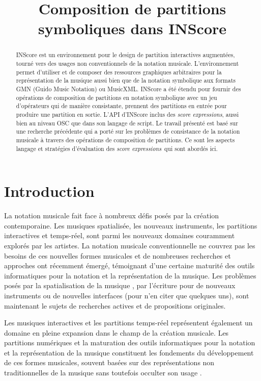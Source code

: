 \documentclass{article}
\title{Composition de partitions symboliques dans INScore}
\newcommand{\sExprs}{\emph{score expressions}}
\begin{document}
%
\maketitle
%
\begin{abstract}
INScore est un environnement pour le design de partition interactives augmentées, tourné vers des usages non conventionnels de la notation musicale. L'environnement permet d'utiliser et de composer des ressources graphiques arbitraires pour la représentation de la musique aussi bien que de la notation symbolique aux formats GMN (Guido Music Notation) ou MusicXML. INScore a été étendu pour fournir des opérations de composition de partitions en notation symbolique avec un jeu d'opérateurs qui de manière consistante, prennent des partitions en entrée pour produire une partition en sortie. L'API d'INScore inclus des \sExprs , aussi bien au niveau OSC que dans son langage de script. 
Le travail présenté est basé sur une recherche précédente qui a porté sur les problèmes de consistance de la notation musicale à travers des opérations de composition de partitions. Ce sont les aspects langage et stratégies d'évaluation des \sExprs\ qui sont abordés ici.
\end{abstract}

\section{Introduction}\label{sec:introduction}

La notation musicale fait face à nombreux défis posés par la création contemporaine. Les musiques spatialisée, les nouveaux instruments, les partitions interactives et temps-réel, sont parmi les nouveaux domaines couramment explorés par les artistes. 
La notation musicale conventionnelle ne couvrez pas les besoins de ces nouvelles formes musicales et de nombreuses recherches et approches ont récemment émergé, témoignant d'une certaine maturité des outils informatiques pour la notation et la représentation de la musique. Les problèmes posés par la spatialisation de la musique \cite{Ellberger_tenor2015}, par l'écriture pour de nouveaux instruments \cite{tmays:2014} ou de nouvelles interfaces  \cite{kschlei:2015} (pour n'en citer que quelques uns), sont maintenant le sujets de recherches actives et de propositions originales.

Les musiques interactives et les partitions temps-réel représentent également un domaine en pleine expansion dans le champ de la création musicale. Les partitions numériques et la maturation des outils informatiques pour la notation et la représentation de la musique constituent les fondements du développement de ces formes musicales, souvent basées sur des représentations non traditionnelles de la musique \cite{RSmith_tenor2015, Hope_tenor2015} sans toutefois occulter son usage \cite{Hoadley12,hoadley14}. 
\end{document}
